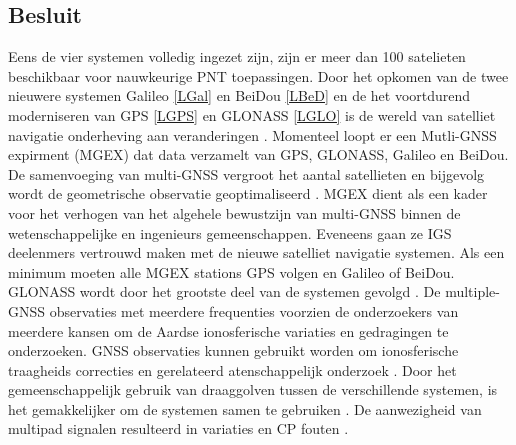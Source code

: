 \subsection{Besluit}
Eens de vier systemen volledig ingezet zijn, zijn er meer dan 100 satelieten beschikbaar voor nauwkeurige PNT toepassingen. Door het opkomen van de twee nieuwere systemen Galileo \ref{LGal} en BeiDou \ref{LBeD} en de het voortdurend moderniseren van GPS \ref{LGPS} en GLONASS \ref{LGLO} is de wereld van satelliet navigatie onderheving aan veranderingen \cite{LBibGNSS4}. Momenteel loopt er een Mutli-GNSS expirment (MGEX) dat data verzamelt van GPS, GLONASS, Galileo en BeiDou. De samenvoeging van multi-GNSS vergroot het aantal satellieten en bijgevolg wordt de geometrische observatie geoptimaliseerd \cite{LBibGNSS5}. 
MGEX dient als een kader voor het verhogen van het algehele bewustzijn van multi-GNSS binnen de wetenschappelijke en ingenieurs gemeenschappen. Eveneens gaan ze IGS deelenmers vertrouwd maken met de nieuwe satelliet navigatie systemen. Als een minimum moeten alle MGEX stations GPS volgen en Galileo of BeiDou. GLONASS wordt door het grootste deel van de systemen gevolgd \cite{LBibGNSS9}.  De multiple-GNSS observaties met meerdere frequenties voorzien de onderzoekers van meerdere kansen om de Aardse ionosferische variaties en gedragingen te onderzoeken. GNSS observaties kunnen gebruikt worden om ionosferische traagheids correcties en gerelateerd atenschappelijk onderzoek \cite{LBibBeiDou}. Door het gemeenschappelijk gebruik van draaggolven tussen de verschillende systemen, is het gemakkelijker om de systemen samen te gebruiken \cite{LBibPPP2}. De aanwezigheid van multipad signalen resulteerd in variaties en CP fouten \cite{LBibGalileo3}. 

